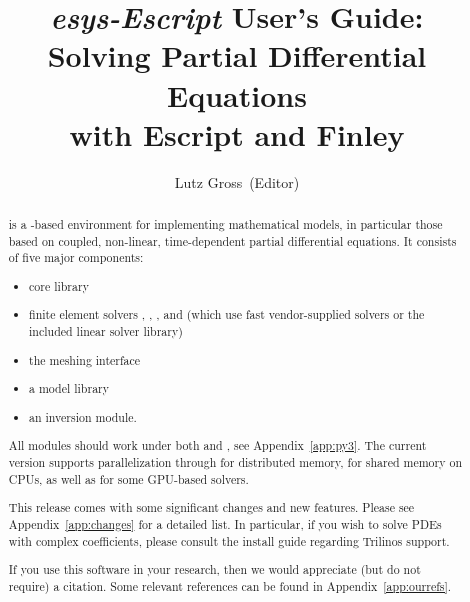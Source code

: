 \documentclass{esysdoc}
\title{\emph{esys-Escript} User's Guide:\\ Solving Partial Differential Equations\\ with Escript and Finley}
\author{Lutz Gross\etal~(Editor)}
\date{\reldate}
\begin{document}
\maketitle

\ifpdf
{}
\fi





\begin{abstract}%
\escript is a \PYTHON-based environment for implementing mathematical models, in particular those based on coupled, non-linear, time-dependent partial differential equations.
It consists of five major components:
\begin{itemize}
\item \escript core library
\item finite element solvers \finley, \dudley, \ripley, and \speckley (which
    use fast vendor-supplied solvers or the included \PASO linear solver library)
\item the meshing interface \pycad
\item a model library
\item an inversion module.
\end{itemize}

All \escript modules should work under both  and , see
Appendix~\ref{app:py3}.
The current version supports parallelization through \MPI for distributed
memory, \OPENMP for shared memory on CPUs, as well as \CUDA for some GPU-based
solvers.

This release comes with some significant changes and new features.
Please see Appendix~\ref{app:changes} for a detailed list.
In particular, if you wish to solve PDEs with complex coefficients, please consult the install guide regarding Trilinos support.

If you use this software in your research, then we would appreciate (but do not
require) a citation.
Some relevant references can be found in Appendix~\ref{app:ourrefs}.
\end{abstract}


\cleardoublepage{}%
\tableofcontents















\esysappendix %

%


\cleardoublepage
{}
{}
\printindex

\cleardoublepage
{}
{}


\end{document}
